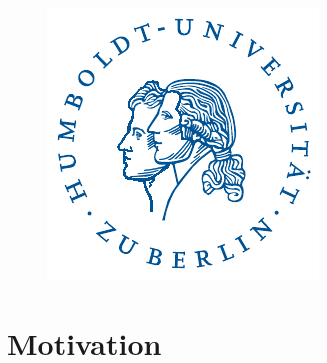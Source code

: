\documentclass[12pt]{article}
\begin{document}
\begin{titlepage}
\begin{center}
		    \begin{figure}[!b]
		    \centering
		    \begin{minipage}{0.45\textwidth}
		        \centering
		        \includegraphics[scale = 0.9]{hulogo.pdf} %
		    \end{minipage}\hfill
		\end{figure}

\end{center}
\end{titlepage}


\newpage
\pagestyle{plain}

\tableofcontents

\newpage

\listoftables

\newpage

\listoffigures

\newpage


\section{Motivation}

\clearpage
\end{document}
